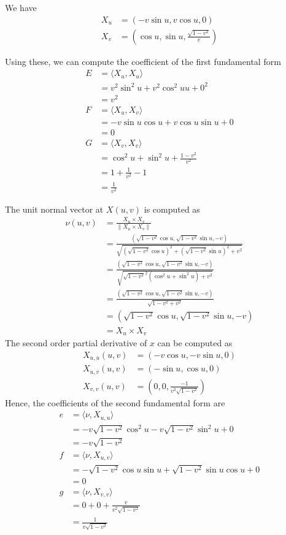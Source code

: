 \documentclass[a4paper]{report}
\begin{document}
We have
\begin{align}
X_u &= \left(-v\sin u, v \cos u ,0  \right)\\
X_v &= \left( \cos u, \sin u , \frac{\sqrt{1-v^2}}{v}\right)
\end{align}

Using these, we can compute the coefficient of the first fundamental form
\begin{align}
E &= \langle X_u, X_u \rangle\\
&= v^2 \sin^2 u  + v^2 \cos^2 u u + 0^2\\
&= v^2\\
F &= \langle X_u, X_v \rangle \\
&= -v \sin u \cos u + v \cos u \sin u + 0\\
&= 0 \\
G &= \langle X_v, X_v \rangle \\
&= \cos^2 u + \sin^2 u + \frac{1 - v^2}{v^2}\\
&= 1 + \frac{1}{v^2} - 1\\
&= \frac{1}{v^2}
\end{align}

The unit normal vector at $X(u,v)$ is computed as
\begin{align}
\nu(u,v) &= \frac{X_u \times X_v}{\lVert X_u \times X_v \rVert}\\
&= \frac{\left(\sqrt{1-v^2} \cos u, \sqrt{1-v^2} \sin u,-v\right)}{\sqrt{(\sqrt{1-v^2} \cos u)^2 + (\sqrt{1-v^2} \sin u)^2 + v^2}}\\
&= \frac{\left(\sqrt{1-v^2} \cos u, \sqrt{1-v^2} \sin u,-v\right)}{\sqrt{\sqrt{1-v^2}^2( \cos^2 u +\sin^2 u) + v^2}}\\
&= \frac{\left(\sqrt{1-v^2} \cos u, \sqrt{1-v^2} \sin u,-v\right)}{\sqrt{1-v^2 + v^2}}\\
&= \left(\sqrt{1-v^2} \cos u, \sqrt{1-v^2} \sin u,-v\right)\\
&= X_u \times X_v
\end{align}
The second order partial derivative of $x$ can be computed as
\begin{align}
X_{u,u}(u,v) &= \left(-v\cos u, -v \sin u, 0 \right)\\
X_{u,v}(u,v) &= \left(-\sin u, \cos u, 0 \right)\\
X_{v,v}(u,v) &= \left(0, 0, \frac{-1}{v^2\sqrt{1-v^2}} \right)
\end{align}
Hence, the coefficients of the second fundamental form are
\begin{align}
e &= \langle \nu, X_{u,u} \rangle\\
&= -v \sqrt{1 - v^2} \cos^2 u -v \sqrt{1 - v^2} \sin^2 u + 0 \\
&= -v \sqrt{1 - v^2} \\
f &= \langle \nu, X_{u,v} \rangle \\
&= -\sqrt{1 - v^2} \cos u \sin u + \sqrt{1 - v^2} \sin u \cos u + 0\\
&= 0\\
g &= \langle \nu, X_{v,v} \rangle \\
&= 0 + 0 + \frac{v}{v^2 \sqrt{1 - v^2}}\\
&= \frac{1}{v \sqrt{1 - v^2}}
\end{align}
\end{document}
